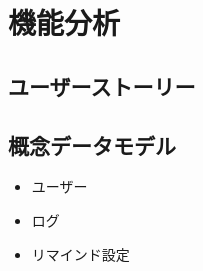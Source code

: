 \section{機能分析} \label{sec:system}

\subsection{ユーザーストーリー}

\subsection{概念データモデル}

\begin{itemize}
  \item ユーザー
  \item ログ
  \item リマインド設定
\end{itemize}
